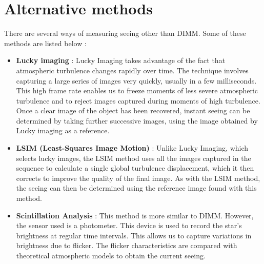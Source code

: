 \section{Alternative methods}
There are several ways of measuring seeing other than \Gls{DIMM}. Some of these methods are listed below :
\begin{itemize}
    \item \textbf{Lucky imaging} : Lucky Imaging takes advantage of the fact that atmospheric turbulence changes 
    rapidly over time. The technique involves capturing a large series of images very quickly, 
    usually in a few milliseconds. This high frame rate enables us to freeze moments of less severe atmospheric 
    turbulence and to reject images captured during moments of high turbulence. Once a clear image of the object 
    has been recovered, instant seeing can be determined by taking further successive images, using the image 
    obtained by Lucky imaging as a reference.
    \item \textbf{LSIM (Least-Squares Image Motion)} : Unlike Lucky Imaging, which selects lucky images, the LSIM 
    method uses all the images captured in the sequence to calculate a single global turbulence displacement, 
    which it then corrects to improve the quality of the final image. As with the LSIM method, the seeing can then 
    be determined using the reference image found with this method.
    \item \textbf{Scintillation Analysis} : This method is more similar to \Gls{DIMM}. However, the sensor used is a photometer. 
    This device is used to record the star's brightness at regular time intervals. This allows us to capture variations 
    in brightness due to flicker. The flicker characteristics are compared with theoretical atmospheric models 
    to obtain the current seeing.
\end{itemize}